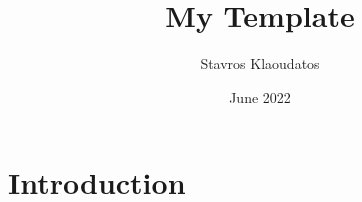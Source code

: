 \documentclass{article}
\title{My Template}
\author{Stavros Klaoudatos}
\date{June 2022}
\begin{document}
\maketitle


\section{Introduction}
\end{document}
